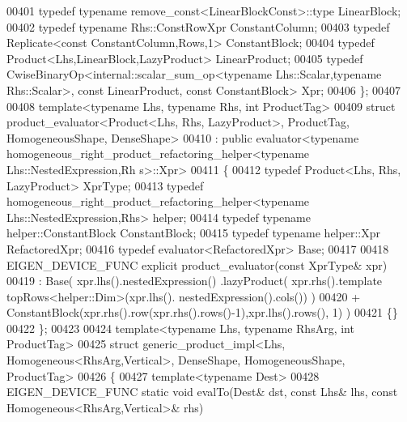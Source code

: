 \begin{DoxyCode}
00401   \textcolor{keyword}{typedef} \textcolor{keyword}{typename} remove\_const<LinearBlockConst>::type                 LinearBlock;
00402   \textcolor{keyword}{typedef} \textcolor{keyword}{typename} Rhs::ConstRowXpr                                     ConstantColumn;
00403   \textcolor{keyword}{typedef} Replicate<const ConstantColumn,Rows,1>                        ConstantBlock;
00404   \textcolor{keyword}{typedef} Product<Lhs,LinearBlock,LazyProduct>                          LinearProduct;
00405   \textcolor{keyword}{typedef} CwiseBinaryOp<internal::scalar\_sum\_op<typename Lhs::Scalar,typename Rhs::Scalar>, \textcolor{keyword}{const} 
      LinearProduct, \textcolor{keyword}{const} ConstantBlock> Xpr;
00406 \};
00407 
00408 \textcolor{keyword}{template}<\textcolor{keyword}{typename} Lhs, \textcolor{keyword}{typename} Rhs, \textcolor{keywordtype}{int} ProductTag>
00409 \textcolor{keyword}{struct }product\_evaluator<Product<Lhs, Rhs, LazyProduct>, ProductTag, HomogeneousShape, DenseShape>
00410  : \textcolor{keyword}{public} evaluator<typename homogeneous\_right\_product\_refactoring\_helper<typename Lhs::NestedExpression,Rh
      s>::Xpr>
00411 \{
00412   \textcolor{keyword}{typedef} Product<Lhs, Rhs, LazyProduct> XprType;
00413   \textcolor{keyword}{typedef} homogeneous\_right\_product\_refactoring\_helper<typename Lhs::NestedExpression,Rhs> helper;
00414   \textcolor{keyword}{typedef} \textcolor{keyword}{typename} helper::ConstantBlock ConstantBlock;
00415   \textcolor{keyword}{typedef} \textcolor{keyword}{typename} helper::Xpr RefactoredXpr;
00416   \textcolor{keyword}{typedef} evaluator<RefactoredXpr> Base;
00417   
00418   EIGEN\_DEVICE\_FUNC \textcolor{keyword}{explicit} product\_evaluator(\textcolor{keyword}{const} XprType& xpr)
00419     : Base(  xpr.lhs().nestedExpression() .lazyProduct(  xpr.rhs().template topRows<helper::Dim>(xpr.lhs().
      nestedExpression().cols()) )
00420             + ConstantBlock(xpr.rhs().row(xpr.rhs().rows()-1),xpr.lhs().rows(), 1) )
00421   \{\}
00422 \};
00423 
00424 \textcolor{keyword}{template}<\textcolor{keyword}{typename} Lhs, \textcolor{keyword}{typename} RhsArg, \textcolor{keywordtype}{int} ProductTag>
00425 \textcolor{keyword}{struct }generic\_product\_impl<Lhs, Homogeneous<RhsArg,Vertical>, DenseShape, HomogeneousShape, ProductTag>
00426 \{
00427   \textcolor{keyword}{template}<\textcolor{keyword}{typename} Dest>
00428   EIGEN\_DEVICE\_FUNC \textcolor{keyword}{static} \textcolor{keywordtype}{void} evalTo(Dest& dst, \textcolor{keyword}{const} Lhs& lhs, \textcolor{keyword}{const} Homogeneous<RhsArg,Vertical>& rhs)

\end{DoxyCode}
